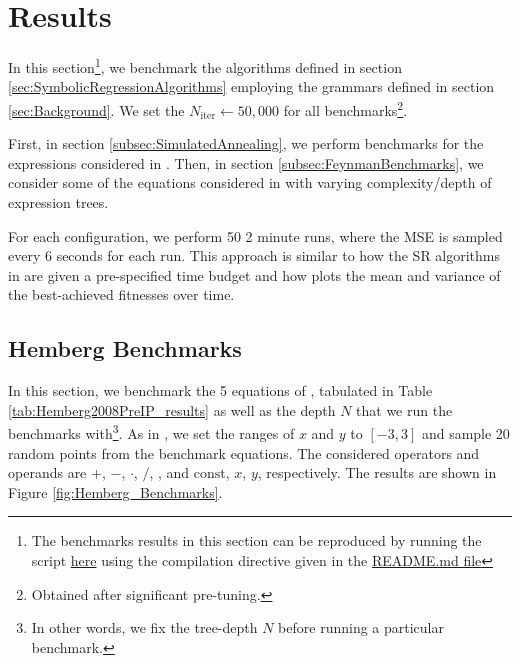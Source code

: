 \documentclass[runningheads]{llncs}
\newcommand\specialcaret{%
  \stackengine{0pt}{\ \,}{\scalebox{1.1}[2]{\raisebox{-0.9ex}{\string^}}}{O}{c}{F}{T}{L}}
\begin{document}
\section{Results}\label{sec:Results}
In this section\footnote{The benchmarks results in this section can be reproduced by running the script \href{https://github.com/edfink234/Alpha-Zero-Symbolic-Regression/blob/b2f7486b0797843ee363b20faa9a30677065f7b9/PrefixPostfixSR.cpp}{here} using the compilation directive given in the \href{https://github.com/edfink234/Alpha-Zero-Symbolic-Regression/blob/b2f7486b0797843ee363b20faa9a30677065f7b9/README.md}{README.md file}}, we benchmark the algorithms defined in section \ref{sec:SymbolicRegressionAlgorithms} employing the grammars defined in section \ref{sec:Background}. We set the $N_{\mathrm{iter}} \gets 50,000$ for all benchmarks\footnote{Obtained after significant pre-tuning.}.
\par First, in section \ref{subsec:SimulatedAnnealing}, we perform benchmarks for the expressions considered in \cite{hemberg2008pre}. Then, in section \ref{subsec:FeynmanBenchmarks}, we consider some of the equations considered in \cite{udrescu2020ai} with varying complexity/depth of expression trees.
\par For each configuration,
we perform 50 2 minute runs, where the MSE is sampled every 6 seconds for each run.  
This approach is similar to how the SR algorithms in \cite{defranca2023interpretable} are given a pre-specified time budget and how \cite{manti2023discovering} plots the mean and variance of the best-achieved fitnesses over time. 

\subsection{Hemberg Benchmarks} \label{subsec:HembergBenchmarks}
In this section, we benchmark the 5 equations of \cite{hemberg2008pre}, tabulated in Table \ref{tab:Hemberg2008PreIP_results} as well as the depth $N$ that we run the benchmarks with\footnote{In other words, we fix the tree-depth $N$ before running a particular benchmark.}. As in \cite{hemberg2008pre}, we set the ranges of $x$ and $y$ to $[-3,3]$ and sample 20 random points from the benchmark equations.  The considered operators and operands are $+$, $-$, $\cdot$, $/$, \specialcaret , and $\mathrm{const}$, $x$, $y$, respectively. The results are shown in Figure \ref{fig:Hemberg_Benchmarks}.
\end{document}
